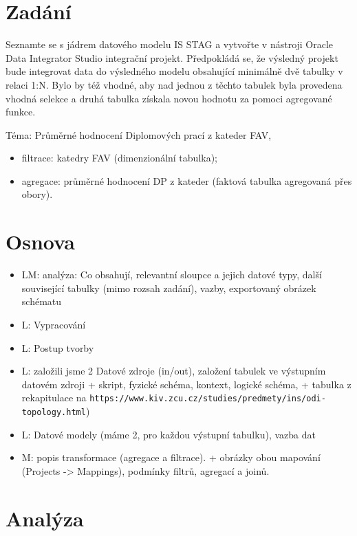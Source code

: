 \section{Zadání}

Seznamte se s jádrem datového modelu IS STAG a vytvořte v nástroji Oracle Data Integrator Studio integrační projekt.
Předpokládá se, že výsledný projekt bude integrovat data do výsledného modelu obsahující minimálně dvě tabulky v relaci 1:N.
Bylo by též vhodné, aby nad jednou z těchto tabulek byla provedena vhodná selekce a druhá tabulka získala novou hodnotu za pomoci agregované funkce.

Téma: Průměrné hodnocení Diplomových prací z kateder FAV,

\begin{itemize}
    \item filtrace: katedry FAV (dimenzionální tabulka);
    \item agregace: průměrné hodnocení DP z kateder (faktová tabulka agregovaná přes obory).
\end{itemize}

\section{Osnova}

\begin{itemize}
    \item LM: analýza: Co obsahují, relevantní sloupce a jejich datové typy, další související tabulky (mimo rozsah zadání), vazby, exportovaný obrázek schématu
    \item L: Vypracování
    \item L: Postup tvorby
    \item L: založili jsme 2 Datové zdroje (in/out), založení tabulek ve výstupním datovém zdroji + skript, fyzické schéma, kontext, logické schéma, + tabulka z rekapitulace na \nolinkurl{https://www.kiv.zcu.cz/studies/predmety/ins/odi-topology.html})
    \item L: Datové modely (máme 2, pro každou výstupní tabulku), vazba dat
    \item M: popis transformace (agregace a filtrace). + obrázky obou mapování (Projects -> Mappings), podmínky filtrů, agregací a joinů.
\end{itemize}




\section{Analýza}

